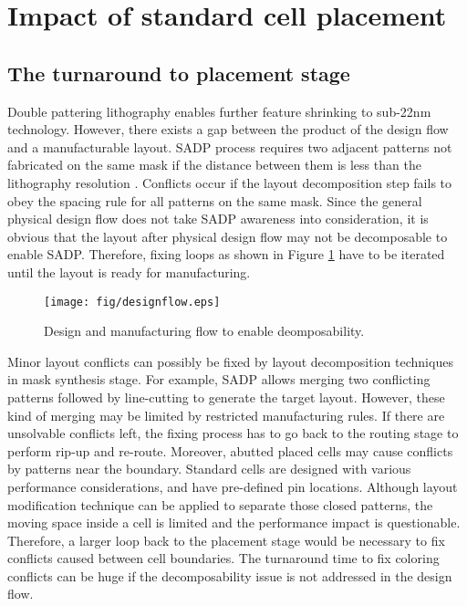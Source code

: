 \section{Impact of standard cell placement} \label{sec:impact}
\subsection{The turnaround to placement stage}
Double pattering lithography enables further feature shrinking to sub-22nm technology. However, there exists a gap between the product of  the design flow and a manufacturable layout. SADP process requires two adjacent patterns not fabricated on the same mask if the distance between them is less than the lithography resolution . Conflicts occur if the layout decomposition step fails to obey the spacing rule  for all patterns on the same mask. Since the general physical design flow does not take SADP awareness into consideration, it is obvious that the layout after physical design flow may not be decomposable to enable SADP. Therefore, fixing loops as shown in Figure \ref{fig:design_flow} have to be iterated until the layout is ready for manufacturing. 

\begin{figure}[h]
 \centering
\texttt{[image: fig/designflow.eps]}
\caption{Design and manufacturing flow to enable deomposability.}
  \label{fig:design_flow}
\end{figure}

Minor layout conflicts can possibly be fixed by layout decomposition techniques in mask synthesis stage. For example, SADP allows merging two conflicting patterns followed by line-cutting \cite{oyama_important_2010, lam_e-beam_2011} to generate the target layout. However, these kind of merging may be limited by restricted manufacturing rules. If there are unsolvable conflicts left, the fixing process has to go back to the routing stage to perform rip-up and re-route. Moreover, abutted placed cells may cause conflicts by patterns near the boundary. Standard cells are designed with various performance considerations, and have pre-defined pin locations. Although layout modification technique \cite{kun_yuan_wisdom:_2010, hsu_tcad_2011} can be applied to separate those closed patterns, the moving space inside a cell is limited and the performance impact is questionable. Therefore, a larger loop back to the placement stage would be necessary to fix conflicts caused between cell boundaries. The turnaround time to fix coloring conflicts can be huge if the decomposability issue is not addressed in the design flow.

